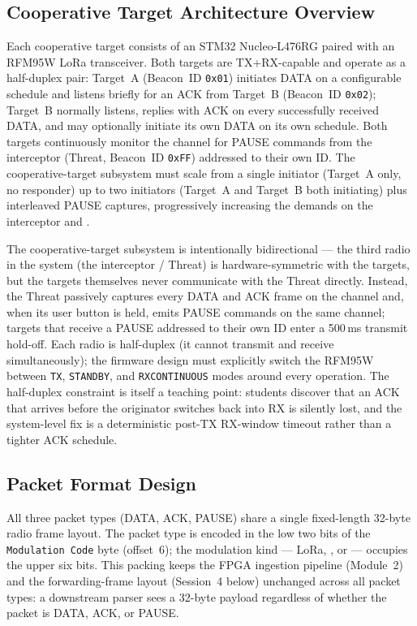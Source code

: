 \documentclass[11pt,letterpaper]{article}
\begin{document}
	\subsection{Cooperative Target Architecture Overview}

	Each cooperative target consists of an STM32 Nucleo-L476RG paired with an RFM95W LoRa transceiver. Both targets are TX+RX-capable and operate as a half-duplex pair: Target~A (Beacon~ID \texttt{0x01}) initiates DATA on a configurable schedule and listens briefly for an ACK from Target~B (Beacon~ID \texttt{0x02}); Target~B normally listens, replies with ACK on every successfully received DATA, and may optionally initiate its own DATA on its own schedule. Both targets continuously monitor the channel for PAUSE commands from the interceptor (Threat, Beacon~ID \texttt{0xFF}) addressed to their own ID. The cooperative-target subsystem must scale from a single initiator (Target~A only, no responder) up to two initiators (Target~A and Target~B both initiating) plus interleaved PAUSE captures, progressively increasing the demands on the interceptor and \FPGA{}.

	\begin{tcolorbox}[infobox={Design Principle: Bidirectional but Half-Duplex}]
		The cooperative-target subsystem is intentionally bidirectional --- the third radio in the system (the interceptor / Threat) is hardware-symmetric with the targets, but the targets themselves never communicate with the Threat directly. Instead, the Threat passively captures every DATA and ACK frame on the channel and, when its user button is held, emits PAUSE commands on the same channel; targets that receive a PAUSE addressed to their own ID enter a 500\,ms transmit hold-off. Each radio is half-duplex (it cannot transmit and receive simultaneously); the firmware design must explicitly switch the RFM95W between \texttt{TX}, \texttt{STANDBY}, and \texttt{RXCONTINUOUS} modes around every operation. The half-duplex constraint is itself a teaching point: students discover that an ACK that arrives before the originator switches back into RX is silently lost, and the system-level fix is a deterministic post-TX RX-window timeout rather than a tighter ACK schedule.
	\end{tcolorbox}

	\newpage
	\subsection{Packet Format Design}

	All three packet types (DATA, ACK, PAUSE) share a single fixed-length 32-byte radio frame layout. The packet type is encoded in the low two bits of the \texttt{Modulation Code} byte (offset~6); the modulation kind --- LoRa, \FSK{}, or \OOK{} --- occupies the upper six bits. This packing keeps the FPGA ingestion pipeline (Module~2) and the forwarding-frame layout (Session~4 below) unchanged across all packet types: a downstream parser sees a 32-byte payload regardless of whether the packet is DATA, ACK, or PAUSE.
\end{document}

